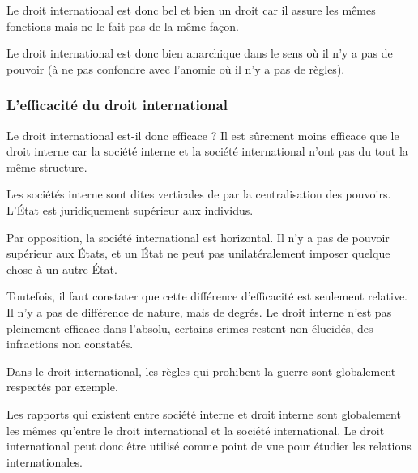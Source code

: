 \documentclass[12pt, a4paper, openany]{book}
\begin{document}
Le droit international est donc bel et bien un droit car il assure les mêmes fonctions mais ne le fait pas de la même façon.

Le droit international est donc bien anarchique dans le sens où il n'y a pas de pouvoir (à ne pas confondre avec l'anomie où il n'y a pas de règles). 

\subsubsection{L'efficacité du droit international}

Le droit international est-il donc efficace ? Il est sûrement moins efficace que le droit interne car la société interne et la société international n'ont pas du tout la même structure.

Les sociétés interne sont dites verticales de par la centralisation des pouvoirs. L'État est juridiquement supérieur aux individus. 

Par opposition, la société international est horizontal. Il n'y a pas de pouvoir supérieur aux États, et un État ne peut pas unilatéralement imposer quelque chose à un autre État.

Toutefois, il faut constater que cette différence d'efficacité est seulement relative. Il n'y a pas de différence de nature, mais de degrés. Le droit interne n'est pas pleinement efficace dans l'absolu, certains crimes restent non élucidés, des infractions non constatés.

Dans le droit international, les règles qui prohibent la guerre sont globalement respectés par exemple. 

Les rapports qui existent entre société interne et droit interne sont globalement les mêmes qu'entre le droit international et la société international. Le droit international peut donc être utilisé comme point de vue pour étudier les relations internationales. 
\end{document}
